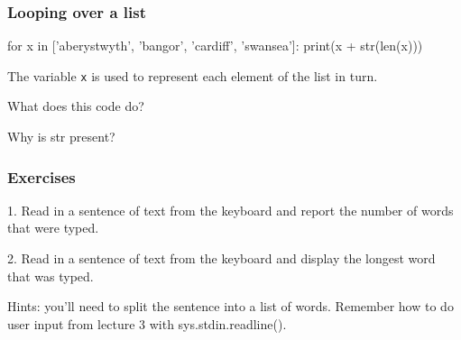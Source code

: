 \documentclass{beamer}
\begin{document}
\begin{frame}[fragile]
\frametitle{Looping over a list}
\begin{code}
for x in ['aberystwyth', 'bangor', 'cardiff', 'swansea']:
   print(x + str(len(x)))
\end{code}

The variable \texttt{x} is used to represent each element of the list
in turn.

What does this code do?

Why is str present?
\end{frame}

\begin{frame}[fragile]
\frametitle{Exercises}
1. Read in a sentence of text from the keyboard and report the number of
words that were typed.

\bigskip

2. Read in a sentence of text from the keyboard and display the longest word
that was typed.

\bigskip 

Hints: you'll need to split the sentence into a list of words. Remember
how to do user input from lecture 3 with sys.stdin.readline().
\end{frame}

\end{document}
